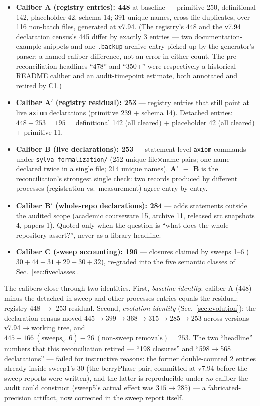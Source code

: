 \begin{itemize}
\item \textbf{Caliber A (registry entries): 448} at baseline ---
primitive 250, definitional 142, placeholder 42, schema 14; 391
unique names,  cross-file duplicates, over 116 non-batch
files, generated at v7.94. (The registry's 448 and the v7.94
declaration census's 445 differ by exactly 3 entries --- two
documentation-example snippets and one \texttt{.backup} archive
entry picked up by the generator's parser; a named caliber
difference, not an error in either count. The pre-reconciliation
headlines ``478'' and ``350+'' were respectively a historical
README caliber and an audit-timepoint estimate, both annotated and
retired by C1.)
\item \textbf{Caliber A$'$ (registry residual): 253} --- registry
entries that still point at live \texttt{axiom} declarations
(primitive 239 + schema 14). Detached entries:
$448-253=195$ = definitional 142 (all cleared) + placeholder 42
(all cleared) + primitive 11.
\item \textbf{Caliber B (live declarations): 253} --- statement-level
\texttt{axiom} commands under \texttt{sylva\_\allowbreak formalization/}
(252 unique file$\times$name pairs; one name declared twice in a
single file; 214 unique names). \textbf{A$'$ $\equiv$ B} is the
reconciliation's strongest single check: two records produced by
different processes (registration vs.\ measurement) agree entry by
entry.
\item \textbf{Caliber B$'$ (whole-repo declarations): 284} --- adds
 statements outside the audited scope (academic
courseware 15, archive 11, released src snapshots 4, papers 1).
Quoted only when the question is ``what does the whole repository
assert?'', never as a library headline.
\item \textbf{Caliber C (sweep accounting): 196} --- closures
claimed by sweeps 1--6 ($30+44+31+29+30+32$), re-graded into the
five semantic classes of Sec.~\ref{sec:fiveclasses}.
\end{itemize}

The calibers close through two identities. First,
\emph{baseline identity}: caliber A (448) minus the
detached-in-sweep-and-other-processes entries equals the residual:
registry 448 $\to$ 253 residual. Second, \emph{evolution identity}
(Sec.~\ref{sec:evolution}): the declaration census moved
$445 \to 399 \to 368 \to 315 \to 285 \to 253$ across versions
v7.94$\to$working tree, and $445 - 166\ (\text{sweeps}_2..6) -
26\ (\text{non-sweep removals}) = 253$. The two ``headline''
numbers that this reconciliation retired --- ``198 closures'' and
``598$\to$568 declarations'' --- failed for instructive reasons:
the former double-counted 2 entries already inside sweep1's 30
(the berryPhase pair, committed at v7.94 before the sweep reports
were written), and the latter is reproducible under \emph{no}
caliber the audit could construct (sweep5's actual effect was
$315\to285$) --- a fabricated-precision artifact, now corrected
in the sweep report itself.

